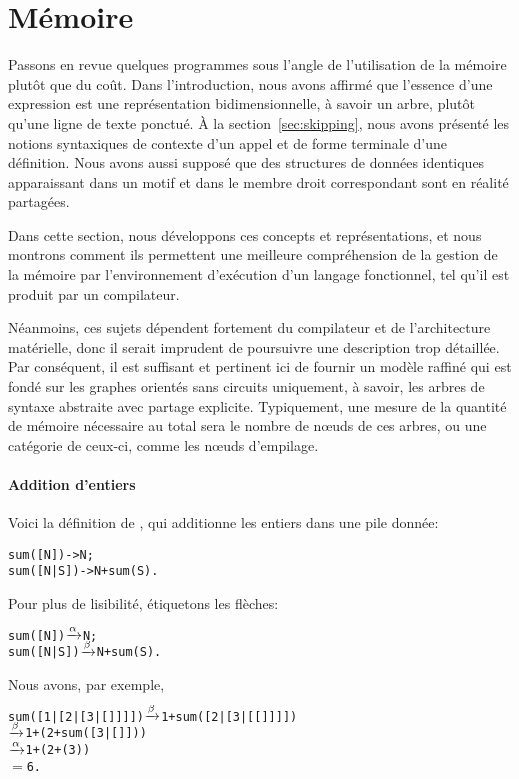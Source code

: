 \section{Mémoire}
\label{sec:memory}

Passons en revue quelques programmes sous l'angle de l'utilisation de
la mémoire plutôt que du coût. Dans l'introduction, nous avons affirmé
que l'essence d'une expression est une représentation
bidimensionnelle, à savoir un arbre, plutôt qu'une ligne de texte
ponctué. À la section~\vref{sec:skipping}, nous avons présenté les
notions syntaxiques de contexte d'un appel et de forme terminale d'une
définition. Nous avons aussi supposé que des structures de données
identiques apparaissant dans un motif et dans le membre droit
correspondant sont en réalité partagées.

Dans cette section, nous développons ces concepts et représentations,
et nous montrons comment ils permettent une meilleure compréhension de
la gestion de la mémoire par l'environnement d'exécution d'un langage
fonctionnel, tel qu'il est produit par un compilateur.

Néanmoins, ces sujets dépendent fortement du compilateur et de
l'architecture matérielle, donc il serait imprudent de poursuivre une
description trop détaillée. Par conséquent, il est suffisant et
pertinent ici de fournir un modèle raffiné qui est fondé sur les
graphes orientés sans circuits uniquement, à savoir, les arbres de
syntaxe abstraite avec partage explicite. Typiquement,
une mesure de la quantité de mémoire nécessaire au total sera le
nombre de n{\oe}uds de ces arbres, ou une catégorie de ceux-ci, comme
les n{\oe}uds d'empilage.

\paragraph{Addition d'entiers}

Voici la définition de , qui additionne les entiers
dans une pile donnée:
\begin{alltt}
sum([N])   -> N;
sum([N|S]) -> N + sum(S).
\end{alltt}
Pour plus de lisibilité, étiquetons les flèches:
\begin{alltt}
sum([N])   \(\xrightarrow{\smash[t]{\alpha}}\) N;
sum([N|S]) \(\xrightarrow{\smash[t]{\beta}}\) N + sum(S).
\end{alltt}
Nous avons, par exemple,
\begin{alltt}
sum([1|[2|[3|[]]]]) \(\xrightarrow{\smash[t]{\beta}}\) 1 + sum([2|[3|[[]]]])
                    \(\xrightarrow{\smash[t]{\beta}}\) 1 + (2 + sum([3|[]]))
                    \(\xrightarrow{\smash[t]{\alpha}}\) 1 + (2 + (3))
                    \(=\) 6.
\end{alltt}

